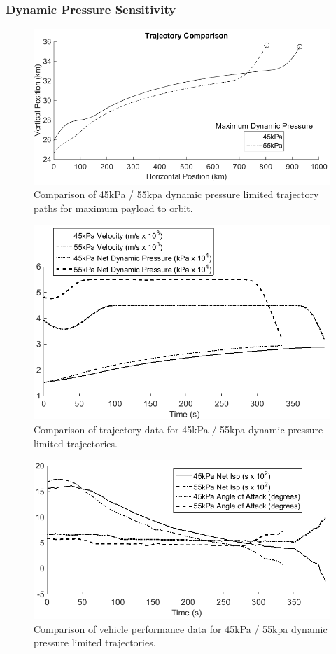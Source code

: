 \documentclass[]{aiaa-tc}
\begin{document}
\subsubsection{Dynamic Pressure Sensitivity}\label{subsection:qvariation}
\begin{figure}[ht]
	\centering
	\includegraphics[width=.7\linewidth]{Multipleq}
	\caption{Comparison of 45kPa / 55kpa dynamic pressure limited trajectory paths for maximum payload to orbit.}
	\label{fig:multipleq}
\end{figure}
\begin{figure}[ht]
	\centering
	
	\includegraphics[width=.6\linewidth]{MultipleqAero}
	\caption{Comparison of trajectory data for 45kPa / 55kpa dynamic pressure limited trajectories.}
	\label{fig:multipleq aero}
\end{figure}
\begin{figure}[ht]
	\centering
	\includegraphics[width=.6\linewidth]{Multipleq-Vehicle}
	\caption{Comparison of vehicle performance data for 45kPa / 55kpa dynamic pressure limited trajectories.}
	\label{fig:multipleq vehicle}
\end{figure}
\end{document}
